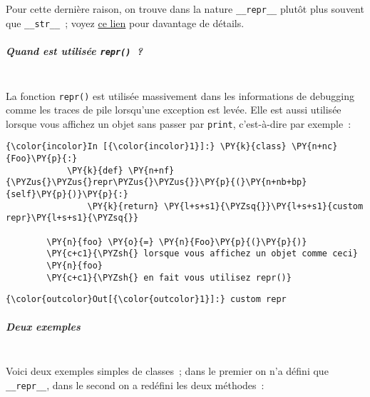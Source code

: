     Pour cette dernière raison, on trouve dans la nature
\texttt{\_\_repr\_\_} plutôt plus souvent que \texttt{\_\_str\_\_}~;
voyez
\href{https://docs.python.org/3/reference/datamodel.html\#object.__repr__}{ce
lien} pour davantage de détails.

    \hypertarget{quand-est-utilisuxe9e-repr}{%
\subparagraph{\texorpdfstring{Quand est utilisée
\texttt{repr()}~?\\\\}{Quand est utilisée repr()~?}}\label{quand-est-utilisuxe9e-repr}}

    La fonction \texttt{repr()} est utilisée massivement dans les
informations de debugging comme les traces de pile lorsqu'une exception
est levée. Elle est aussi utilisée lorsque vous affichez un objet sans
passer par \texttt{print}, c'est-à-dire par exemple~:

    \begin{Verbatim}[commandchars=\\\{\}]
{\color{incolor}In [{\color{incolor}1}]:} \PY{k}{class} \PY{n+nc}{Foo}\PY{p}{:} 
            \PY{k}{def} \PY{n+nf}{\PYZus{}\PYZus{}repr\PYZus{}\PYZus{}}\PY{p}{(}\PY{n+nb+bp}{self}\PY{p}{)}\PY{p}{:}
                \PY{k}{return} \PY{l+s+s1}{\PYZsq{}}\PY{l+s+s1}{custom repr}\PY{l+s+s1}{\PYZsq{}}
            
        \PY{n}{foo} \PY{o}{=} \PY{n}{Foo}\PY{p}{(}\PY{p}{)}
        \PY{c+c1}{\PYZsh{} lorsque vous affichez un objet comme ceci}
        \PY{n}{foo}
        \PY{c+c1}{\PYZsh{} en fait vous utilisez repr()}
\end{Verbatim}


\begin{Verbatim}[commandchars=\\\{\}]
{\color{outcolor}Out[{\color{outcolor}1}]:} custom repr
\end{Verbatim}
            
    \hypertarget{deux-exemples}{%
\subparagraph{Deux exemples\\\\}\label{deux-exemples}}

    Voici deux exemples simples de classes~; dans le premier on n'a défini
que \texttt{\_\_repr\_\_}, dans le second on a redéfini les deux
méthodes~:

